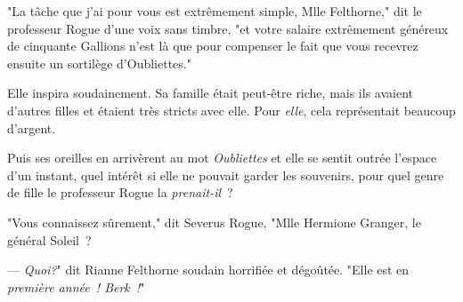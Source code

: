 "La tâche que j'ai pour vous est extrêmement simple, Mlle Felthorne," dit le professeur Rogue d'une voix sans timbre, "et votre salaire extrêmement généreux de cinquante Gallions n'est là que pour compenser le fait que vous recevrez ensuite un sortilège d'Oubliettes."

Elle inspira soudainement. Sa famille était peut-être riche, mais ils avaient d'autres filles et étaient très stricts avec elle. Pour \emph{elle}, cela représentait beaucoup d'argent.

Puis ses oreilles en arrivèrent au mot \emph{Oubliettes} et elle se sentit outrée l'espace d'un instant, quel intérêt si elle ne pouvait garder les souvenirs, pour quel genre de fille le professeur Rogue la \emph{prenait-il}~?

"Vous connaissez sûrement," dit Severus Rogue, "Mlle Hermione Granger, le général Soleil~?

--- \emph{Quoi?}" dit Rianne Felthorne soudain horrifiée et dégoûtée. "Elle est en \emph{première année~! Berk~!}" 


